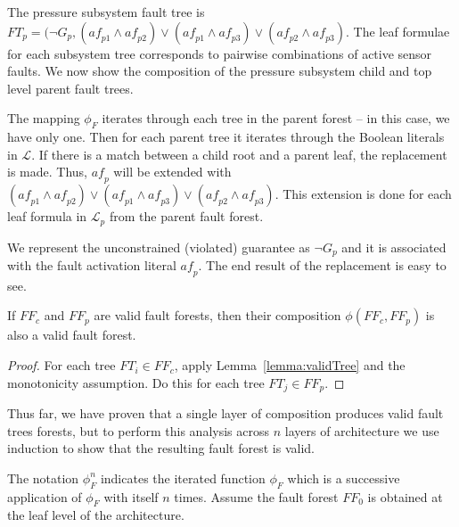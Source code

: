 The pressure subsystem fault tree is $\mathit{FT}_{p} = (\neg G_p, (\mathit{af}_{p1} \land \mathit{af}_{p2}) \lor (\mathit{af}_{p1} \land \mathit{af}_{p3}) \lor (\mathit{af}_{p2} \land \mathit{af}_{p3}) $. The leaf formulae for each subsystem tree corresponds to pairwise combinations of active sensor faults. We now show the composition of the pressure subsystem child and top level parent fault trees. 

The mapping $\phi_F$ iterates through each tree in the parent forest -- in this case, we have only one. Then for each parent tree it iterates through the Boolean literals in $\mathcal{L}$. If there is a match between a child root and a parent leaf, the replacement is made.
Thus, $\mathit{af}_p$ will be extended with $(\mathit{af}_{p1} \land \mathit{af}_{p2}) \lor (\mathit{af}_{p1} \land \mathit{af}_{p3}) \lor (\mathit{af}_{p2} \land \mathit{af}_{p3})$. This extension is done for each leaf formula in $\mathcal{L}_p$ from the parent fault forest. 

We represent the unconstrained (violated) guarantee as $\neg G_p$ and it is associated with the fault activation literal $\mathit{af}_p$. The end result of the replacement is easy to see.

\begin{lemma} If $\mathit{FF}_c$ and $\mathit{FF}_p$ are valid fault forests, then their composition $\phi(\mathit{FF}_c, \mathit{FF}_p)$ is also a valid fault forest. 
\begin{proof}

For each tree $\mathit{FT}_i \in \mathit{FF}_c$, apply Lemma~\ref{lemma:validTree} and the monotonicity assumption. Do this for each tree $\mathit{FT}_j \in \mathit{FF}_p$.
\end{proof}
\label{lemma:validForest}
\end{lemma}

Thus far, we have proven that a single layer of composition produces valid fault trees forests, but to perform this analysis across $n$ layers of architecture we use induction to show that the resulting fault forest is valid. 

The notation $\phi_F^n$ indicates the iterated function $\phi_F$ which is a successive application of $\phi_F$ with itself $n$ times. Assume the fault forest $\mathit{FF_0}$ is obtained at the leaf level of the architecture.

